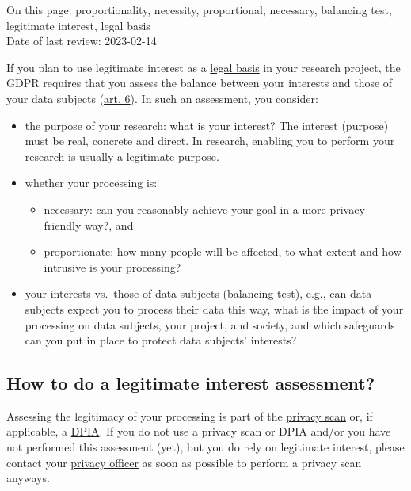 \documentclass[
]{book}
\providecommand{\tightlist}{%
  \setlength{\itemsep}{0pt}\setlength{\parskip}{0pt}}
\begin{document}
On this page: proportionality, necessity, proportional, necessary, balancing
test, legitimate interest, legal basis\\
Date of last review: 2023-02-14

If you plan to use legitimate interest as a \protect\hyperlink{legal-basis}{legal basis} in your
research project, the GDPR requires that you assess the balance between your
interests and those of your data subjects
(\href{https://gdpr-info.eu/art-6-gdpr/}{art. 6}). In such an
assessment, you consider:

\begin{itemize}
\tightlist
\item
  the purpose of your research: what is your interest? The interest (purpose)
  must be real, concrete and direct. In research, enabling you to perform your
  research is usually a legitimate purpose.
\item
  whether your processing is:

  \begin{itemize}
  \tightlist
  \item
    necessary: can you reasonably achieve your goal in a more privacy-friendly
    way?, and
  \item
    proportionate: how many people will be affected, to what extent and how
    intrusive is your processing?
  \end{itemize}
\item
  your interests vs.~those of data subjects (balancing test), e.g., can data
  subjects expect you to process their data this way, what is the impact of your
  processing on data subjects, your project, and society, and which safeguards can
  you put in place to protect data subjects' interests?
\end{itemize}

\hypertarget{lia-how}{%
\subsection{How to do a legitimate interest assessment?}\label{lia-how}}

Assessing the legitimacy of your processing is part of the
\protect\hyperlink{privacy-scan}{privacy scan} or, if applicable, a \protect\hyperlink{dpia}{DPIA}. If you do not
use a privacy scan or DPIA and/or you have not performed this assessment (yet),
but you do rely on legitimate interest, please contact your
\protect\hyperlink{support}{privacy officer} as soon as possible to perform a privacy scan anyways.
\end{document}
